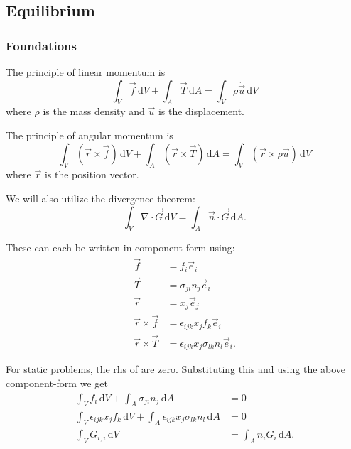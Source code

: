 
\subsection{Equilibrium}

\subsubsection{Foundations}
The principle of linear momentum is
\begin{equation} \label{eq:linmomprin}
  \int_V \Vec{f} \, \mathrm{d}V + \int_A \Vec{T} \, \mathrm{d}A = \int_V \rho \ddot{\Vec{u}} \, \mathrm{d}V
\end{equation}
where $\rho$ is the mass density and $\Vec{u}$ is the displacement.

The principle of angular momentum is
\begin{equation} \label{eq:angmomprin}
  \int_V \left( \Vec{r} \times \Vec{f} \right) \, \mathrm{d}V + \int_A \left( \Vec{r} \times \Vec{T} \right) \, \mathrm{d}A = \int_V \left( \Vec{r} \times \rho \ddot{\Vec{u}} \right) \, \mathrm{d}V
\end{equation}
where $\Vec{r}$ is the position vector.

We will also utilize the divergence theorem:
\begin{equation} \label{eq:divthe}
  \int_V \nabla \cdot \Vec{G} \, \mathrm{d}V = \int_A \Vec{n} \cdot \Vec{G} \, \mathrm{d}A
.\end{equation}

These can each be written in component form using:
\begin{align*}
  \Vec{f} &= f_i \Vec{e}_i \\
  \Vec{T} &= \sigma_{ji} n_j \Vec{e}_i \\
  \Vec{r} &= x_j \Vec{e}_j \\
  \Vec{r} \times \Vec{f} &= \epsilon_{ijk} x_j f_k \Vec{e}_i \\
  \Vec{r} \times \Vec{T} &= \epsilon_{ijk} x_j \sigma_{lk} n_l \Vec{e}_i
.\end{align*}

For static problems, the rhs of  are zero.
Substituting this and using the above component-form we get
\begin{align}
  \int_V f_i \, \mathrm{d}V + \int_A \sigma_{ji} n_j \, \mathrm{d}A &= 0 \label{eq:linmomprincom}\\
  \int_V \epsilon_{ijk} x_j f_k \, \mathrm{d}V + \int_A \epsilon_{ijk} x_j \sigma_{lk} n_l \, \mathrm{d}A &= 0 \label{eq:angmomprincom}\\
  \int_V G_{i,i} \, \mathrm{d}V &= \int_A n_i G_i \, \mathrm{d}A \label{eq:divthecom}
.\end{align}

